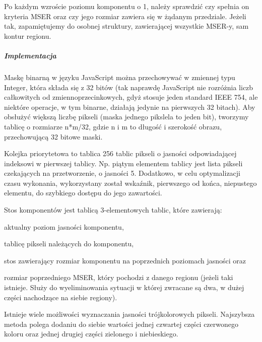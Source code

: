 Po każdym wzroście poziomu komponentu o 1, należy sprawdzić czy spełnia on
kryteria MSER oraz czy jego rozmiar zawiera się w żądanym przedziale. Jeżeli
tak, zapamiętujemy do osobnej struktury, zawierającej wszystkie MSER-y, sam
kontur regionu.

\subparagraph{Implementacja}

Maskę binarną w języku JavaScript można przechowywać w zmiennej typu Integer,
która składa się z 32 bitów (tak naprawdę JavaScript nie rozróżnia liczb
całkowitych od zmiennoprzecinkowych, gdyż stosuje jeden standard IEEE 754, ale
niektóre operacje, w tym binarne, działają jedynie na pierwszych 32 bitach).
Aby obsłużyć większą liczbę pikseli (maska jednego pikslela to jeden bit),
tworzymy tablicę o rozmiarze n*m/32, gdzie n i m to długość i szerokość obrazu,
przechowującą 32 bitowe maski.

Kolejka priorytetowa to tablica 256 tablic pikseli o jasności odpowiadającej
indeksowi w pierwszej tablicy. Np. piątym elementem tablicy jest lista pikseli
czekających na przetworzenie, o jasności 5. Dodatkowo, w celu optymalizacji
czasu wykonania, wykorzystany został wskaźnik, pierwszego od końca, niepustego
elementu, do szybkiego dostępu do jego zawartości.

Stos komponentów jest tablicą 3-elementowych tablic, które zawierają:
\begin{inparaenum} \item aktualny poziom jasności
  komponentu, \item tablicę pikseli należących do komponentu, \item stos
  zawierający rozmiar komponentu na poprzednich poziomach jasności oraz \item
  rozmiar poprzedniego MSER, który pochodzi z danego regionu (jeżeli taki
  istnieje. Służy do wyeliminowania sytuacji w której zwracane są dwa, w dużej
  części nachodzące na siebie regiony).  \end{inparaenum}

Istnieje wiele możliwości wyznaczania jasności trójkolorowych pikseli.
Najszybsza metoda polega dodaniu do siebie wartości jednej czwartej części
czerwonego koloru oraz jednej drugiej części zielonego i niebieskiego.
